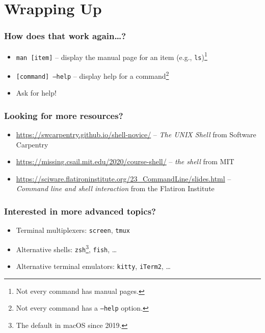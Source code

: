 \documentclass[aspectratio=169]{beamer}
\begin{document}
\section{Wrapping Up}

\frame{\sectionpage}

\begin{frame}
	\frametitle{How does that work again\dots?}
	\begin{itemize}
		\item \texttt{man [item]} -- display the manual page for an item (e.g., \texttt{ls})\footnote{Not every command has manual pages.}
		\item \texttt{[command] --help} -- display help for a command\footnote{Not every command has a \texttt{--help} option.}
		\item Ask for help!
	\end{itemize}
\end{frame}

\begin{frame}
	\frametitle{Looking for more resources?}
	\begin{itemize}
		\item \url{https://swcarpentry.github.io/shell-novice/} -- \textit{The UNIX Shell} from Software Carpentry
		\item \url{https://missing.csail.mit.edu/2020/course-shell/} -- \textit{the shell} from MIT
		\item \url{https://sciware.flatironinstitute.org/23_CommandLine/slides.html} -- \textit{Command line and shell interaction} from the Flatiron Institute
	\end{itemize}
\end{frame}

\begin{frame}
	\frametitle{Interested in more advanced topics?}
	\begin{itemize}
		\item Terminal multiplexers: \texttt{screen}, \texttt{tmux}
		\item Alternative shells: \texttt{zsh}\footnote{The default in macOS since 2019.}, \texttt{fish}, \dots
		\item Alternative terminal emulators: \texttt{kitty}, \texttt{iTerm2}, \dots
	\end{itemize}
\end{frame}
\end{document}
